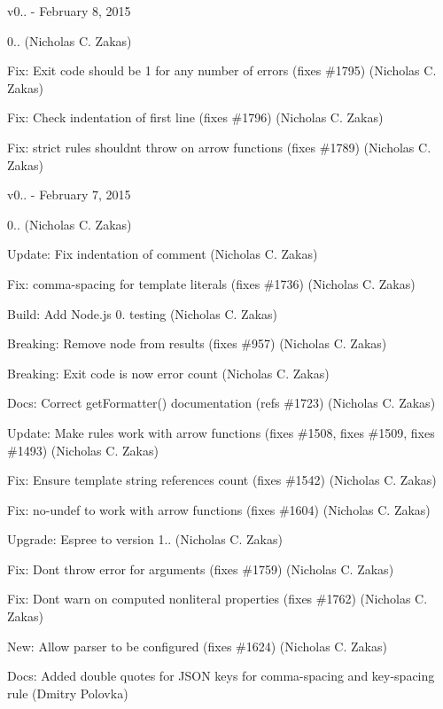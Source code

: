 v0.. -\/ February 8, 2015


\begin{DoxyItemize}
\item 0.. (Nicholas C. Zakas)
\item Fix\+: Exit code should be 1 for any number of errors (fixes \#1795) (Nicholas C. Zakas)
\item Fix\+: Check indentation of first line (fixes \#1796) (Nicholas C. Zakas)
\item Fix\+: strict rules shouldn\textquotesingle{}t throw on arrow functions (fixes \#1789) (Nicholas C. Zakas)
\end{DoxyItemize}

v0.. -\/ February 7, 2015


\begin{DoxyItemize}
\item 0.. (Nicholas C. Zakas)
\item Update\+: Fix indentation of comment (Nicholas C. Zakas)
\item Fix\+: comma-\/spacing for template literals (fixes \#1736) (Nicholas C. Zakas)
\item Build\+: Add Node.\+js 0. testing (Nicholas C. Zakas)
\item Breaking\+: Remove node from results (fixes \#957) (Nicholas C. Zakas)
\item Breaking\+: Exit code is now error count (Nicholas C. Zakas)
\item Docs\+: Correct get\+Formatter() documentation (refs \#1723) (Nicholas C. Zakas)
\item Update\+: Make rules work with arrow functions (fixes \#1508, fixes \#1509, fixes \#1493) (Nicholas C. Zakas)
\item Fix\+: Ensure template string references count (fixes \#1542) (Nicholas C. Zakas)
\item Fix\+: no-\/undef to work with arrow functions (fixes \#1604) (Nicholas C. Zakas)
\item Upgrade\+: Espree to version 1.. (Nicholas C. Zakas)
\item Fix\+: Don\textquotesingle{}t throw error for arguments (fixes \#1759) (Nicholas C. Zakas)
\item Fix\+: Don\textquotesingle{}t warn on computed nonliteral properties (fixes \#1762) (Nicholas C. Zakas)
\item New\+: Allow parser to be configured (fixes \#1624) (Nicholas C. Zakas)
\item Docs\+: Added double quotes for J\+S\+ON keys for comma-\/spacing and key-\/spacing rule (Dmitry Polovka)

\end{DoxyItemize}
